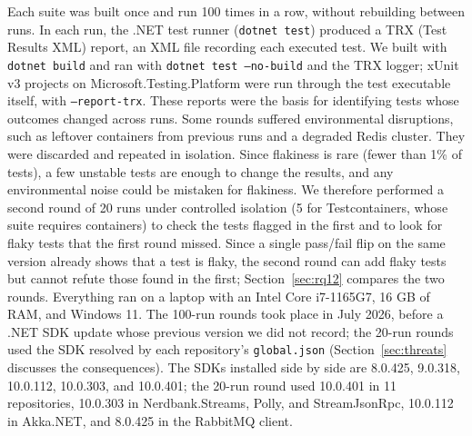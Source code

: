  Each suite was built once and run 100 times in a row, without rebuilding between runs.  In each run, the .NET test runner (\texttt{dotnet test}) produced a TRX (Test Results XML) report, an XML file recording each executed test. We built with \texttt{dotnet build} and ran with \texttt{dotnet test --no-build} and the TRX logger; xUnit v3 projects on Microsoft.Testing.Platform were run through the test executable itself, with \texttt{--report-trx}. These reports were the basis for identifying tests whose outcomes changed across runs. Some rounds suffered environmental disruptions, such as leftover containers from previous runs and a degraded Redis cluster. They were discarded and repeated in isolation. Since flakiness is rare (fewer than 1\% of tests), a few unstable tests are enough to change the results, and any environmental noise could be mistaken for flakiness. We therefore performed a second round of 20 runs under controlled isolation (5 for Testcontainers, whose suite requires containers) to check the tests flagged in the first and to look for flaky tests that the first round missed. Since a single pass/fail flip on the same version already shows that a test is flaky, the second round can add flaky tests but cannot refute those found in the first; Section~\ref{sec:rq12} compares the two rounds. Everything ran on a laptop with an Intel Core i7-1165G7, 16 GB of RAM, and Windows 11.  The 100-run rounds took place in July 2026, before a .NET SDK update whose previous version we did not record; the 20-run rounds used the SDK resolved by each repository's \texttt{global.json} (Section~\ref{sec:threats} discusses the consequences).  The SDKs installed side by side are 8.0.425, 9.0.318, 10.0.112, 10.0.303, and 10.0.401; the 20-run round used 10.0.401 in 11 repositories, 10.0.303 in Nerdbank.Streams, Polly, and StreamJsonRpc, 10.0.112 in Akka.NET, and 8.0.425 in the RabbitMQ client.

